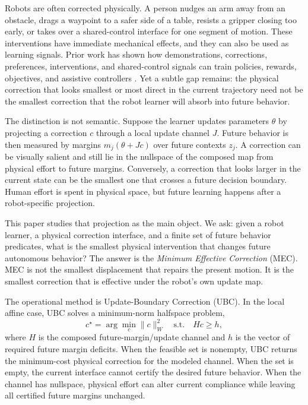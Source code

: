 \documentclass{article}
\begin{document}
Robots are often corrected physically. A person nudges an arm away from an
obstacle, drags a waypoint to a safer side of a table, resists a gripper closing
too early, or takes over a shared-control interface for one segment of motion.
These interventions have immediate mechanical effects, and they can also be used
as learning signals. Prior work has shown how demonstrations, corrections,
preferences, interventions, and shared-control signals can train policies,
rewards, objectives, and assistive controllers
\citep{argall2009survey,chernova2014robot,bajcsy2017learning,bajcsy2018learning,
sadigh2017active,ross2011dagger,kelly2019hgdagger}. Yet a subtle gap remains:
the physical correction that looks smallest or most direct in the current
trajectory need not be the smallest correction that the robot learner will
absorb into future behavior.

The distinction is not semantic. Suppose the learner updates parameters
$\theta$ by projecting a correction $c$ through a local update channel $J$.
Future behavior is then measured by margins $m_j(\theta+Jc)$ over future
contexts $z_j$. A correction can be visually salient and still lie in the
nullspace of the composed map from physical effort to future margins. Conversely,
a correction that looks larger in the current state can be the smallest one that
crosses a future decision boundary. Human effort is spent in physical space, but
future learning happens after a robot-specific projection.

This paper studies that projection as the main object. We ask: given a robot
learner, a physical correction interface, and a finite set of future behavior
predicates, what is the smallest physical intervention that changes future
autonomous behavior? The answer is the \emph{Minimum Effective Correction}
(MEC). MEC is not the smallest displacement that repairs the present motion. It
is the smallest correction that is effective under the robot's own update map.

The operational method is Update-Boundary Correction (UBC). In the local affine
case, UBC solves a minimum-norm halfspace problem,
\begin{equation}
    c^\star = \arg\min_c \|c\|_W^2
    \quad\textrm{s.t.}\quad Hc \ge h,
    \label{eq:intro-ubc}
\end{equation}
where $H$ is the composed future-margin/update channel and $h$ is the vector of
required future margin deficits. When the feasible set is nonempty, UBC returns
the minimum-cost physical correction for the modeled channel. When the set is
empty, the current interface cannot certify the desired future behavior. When
the channel has nullspace, physical effort can alter current compliance while
leaving all certified future margins unchanged.
\end{document}
